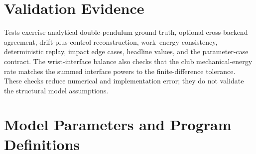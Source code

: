 \documentclass[
  letterpaper,
]{report}
\begin{document}
\chapter{Validation Evidence}\label{sec-appendix-validation}

Tests exercise analytical double-pendulum ground truth, optional
cross-backend agreement, drift-plus-control reconstruction, work--energy
consistency, deterministic replay, impact edge cases, headline values,
and the parameter-case contract. The wrist-interface balance also checks
that the club mechanical-energy rate matches the summed interface powers
to the finite-difference tolerance. These checks reduce numerical and
implementation error; they do not validate the structural model
assumptions.

\chapter{Model Parameters and Program
Definitions}\label{sec-appendix-params}
\end{document}
